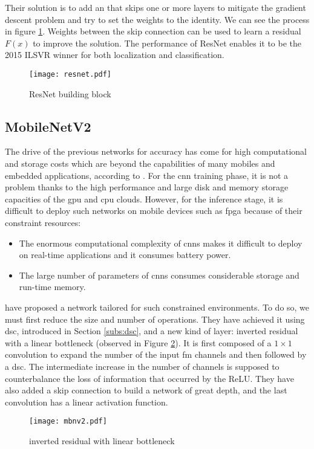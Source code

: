 Their solution is to add an  that skips one or more layers to mitigate the gradient descent problem and try to set the weights to the identity. We can see the process in figure \ref{fig:resnet}. Weights between the skip connection can be used to learn a residual $F(x)$ to improve the solution. The performance of ResNet enables it to be the 2015 ILSVR winner for both localization and classiﬁcation.
%
\begin{figure}
    \centering
    \texttt{[image: resnet.pdf]}
    \caption{ResNet building block \cite{he_deep_2015}}
    \label{fig:resnet}
\end{figure}
%
\subsection{MobileNetV2} \label{subs:mbv2}
The drive of the previous networks for accuracy has come for high computational and storage costs which are beyond the capabilities of many mobiles and embedded applications, according to \textcite{cheng_recent_2018}. For the \acrshort{cnn} training phase, it is not a problem thanks to the high performance and large disk and memory storage capacities of the \acrshort{gpu} and \acrshort{cpu} clouds. However, for the inference stage, it is difficult to deploy such networks on mobile devices such as \acrshort{fpga} because of their constraint resources:
%
\begin{itemize}
    \item The enormous computational complexity of \acrshort{cnn}s makes it difficult to deploy on real-time applications and it consumes battery power.
    \item The large number of parameters of \acrshort{cnn}s consumes considerable storage and run-time memory.
\end{itemize}

\textcite{sandler_mobilenetv2_2019} have proposed a network tailored for such constrained environments. To do so, we must first reduce the size and number of operations. They have achieved it using \acrshort{dsc}, introduced in Section \ref{subs:dsc}, and a new kind of layer: inverted residual with a linear bottleneck (observed in Figure \ref{fig:invreslinbot}). It is first composed of a $1 \times 1$ convolution to expand the number of the input \acrshort{fm} channels and then followed by a \acrshort{dsc}. The intermediate increase in the number of channels is supposed to counterbalance the loss of information that occurred by the ReLU. They have also added a skip connection to build a network of great depth, and the last convolution has a linear activation function.
%
\begin{figure}
    \centering
    \texttt{[image: mbnv2.pdf]}
    \caption{inverted residual with linear bottleneck \cite{sandler_mobilenetv2_2019}}
    \label{fig:invreslinbot}
\end{figure}
